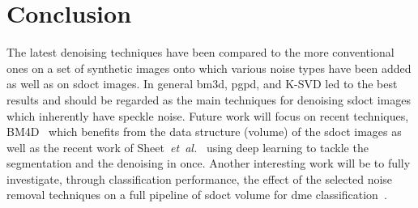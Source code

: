 \section{Conclusion} \label{sc:final-remarks}

The latest denoising techniques have been compared to the more conventional ones on a set of synthetic images onto which various noise types have been added as well as on \ac{sdoct} images.
In general \ac{bm3d}, \ac{pgpd}, and K-SVD led to the best results and should be regarded as the main techniques for denoising \ac{sdoct} images which inherently have speckle noise.
Future work will focus on recent techniques, BM4D~\cite{Maggioni} which benefits from the data structure (volume) of the \ac{sdoct} images as well as the recent work of Sheet~\emph{et~al.}~\cite{7163987} using deep learning to tackle the segmentation and the denoising in once.
Another interesting work will be to fully investigate, through classification performance, the effect of the selected noise removal techniques on a full pipeline of \ac{sdoct} volume for \ac{dme} classification~\cite{lemaitre2015classification}.